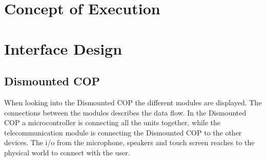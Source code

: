 \section{Concept of Execution}

\section{Interface Design}

\subsection{Dismounted COP}
When looking into the Dismounted COP the different modules are displayed. The connections between the modules describes the data flow. In the Dismounted COP a microcontroller is connecting all the units together, while the telecommunication module is connecting the Dismounted COP to the other devices. The i/o from the microphone, speakers and touch screen reaches to the physical world to connect with the user.